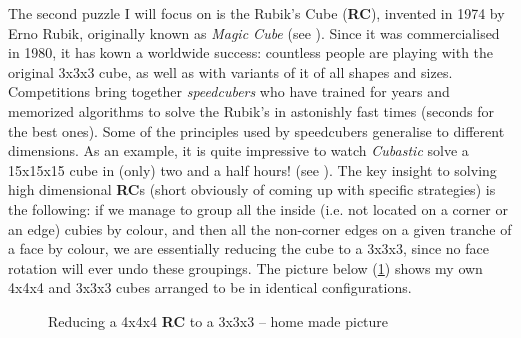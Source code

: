 The second puzzle I will focus on is the Rubik's Cube (\textbf{RC}), invented in 1974 by Erno Rubik, originally known as \textit{Magic Cube} (see \cite{RubiksWiki}). Since it was commercialised in 1980, it has kown a worldwide success: countless people are playing with the original 3x3x3 cube, as well as with variants of it of all shapes and sizes. Competitions bring together \textit{speedcubers} who have trained for years and memorized algorithms to solve the Rubik's in astonishly fast times (seconds for the best ones). Some of the principles used by speedcubers generalise to different dimensions. As an example, it is quite impressive to watch \textit{Cubastic} solve a 15x15x15 cube in (only) two and a half hours! (see \cite{151515Rubiks}). The key insight to solving high dimensional \textbf{RC}s (short obviously of coming up with specific strategies) is the following: if we manage to group all the inside (i.e. not located on a corner or an edge) cubies by colour, and then all the non-corner edges on a given tranche of a face by colour, we are essentially reducing the cube to a 3x3x3, since no face rotation will ever undo these groupings. The picture below (\ref{fig:4442333}) shows my own 4x4x4 and 3x3x3 cubes arranged to be in identical configurations.
\begin{figure}[H]
  \noindent
  \caption[Reducing RC]{Reducing a 4x4x4 \textbf{RC} to a 3x3x3 -- home made picture}
  \label{fig:4442333}
\end{figure}
